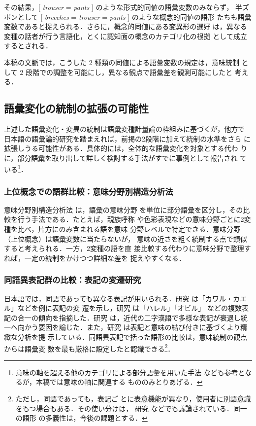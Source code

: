 \documentclass[submit]{ipsj}
\begin{document}
その結果，[ \emph{trouser} = \emph{pants} ] のような形式的同値の語彙変数のみならず，
半ズボンとして [ \emph{breeches} = \emph{trouser} = \emph{pants} ] のような概念的同値の語形
たちも語彙変数であると捉えられる．さらに，概念的同値にある変異形の選好
は，異なる変種の話者が行う言語化，とくに認知面の概念のカテゴリ化の根拠
として成立するとされる\cite{DePascale2019Tokenbased}．

本稿の文脈では，こうした 2 種類の同値による語彙変数の規定は，意味統制
として 2 段階での調整を可能にし，異なる観点で語彙差を観測可能にしたと
考える．
\subsection{語彙変化の統制の拡張の可能性\label{org5d51506}}
\label{sec:org1c43f4d}
上述した語彙変化・変異の統制は語彙変種計量論の枠組みに基づくが，他方で
日本語の語彙論的研究を踏まえれば，前掲の2段階に加えて統制の水準をさら
に拡張しうる可能性がある．具体的には，全体的な語彙変化を対象とする代わ
りに，部分語彙を取り出して詳しく検討する手法がすでに事例として報告され
ている\footnote{意味の軸を超える他のカテゴリによる部分語彙を用いた手法
\cite{ito2008Goi} なども参考となるが，本稿では意味の軸に関連する
もののみとりあげる．}．
\subsubsection{上位概念での語群比較：意味分野別構造分析法}
\label{sec:orgc68dd7f}
意味分野別構造分析法 \cite{tajima2000Goikenkyu} は，語彙の意味分野
を単位に部分語彙を区分し，その比較を行う手法である．たとえば，親族呼称
や色彩表現などの意味分野ごとに2変種を比べ，片方にのみ含まれる語を意味
分野レベルで特定できる．意味分野（上位概念）は語彙変数に当たらないが，
意味の近さを粗く統制する点で類似すると考えられる．一方，2変種の語を直
接比較する代わりに意味分野で整理すれば，一定の統制をかけつつ詳細な差を
捉えやすくなる．
\subsubsection{同語異表記群の比較：表記の変遷研究}
\label{sec:orgec0c737}
日本語では，同語であっても異なる表記が用いられる．研究
\cite{takahashi2019Kindai} は「カワル・カエル」などを例に表記の変
遷を示し，研究 \cite{takahashi2016Kindai} は「ハレル」「オビル」
などの複数表記の合一の傾向を指摘した．研究
\cite{mabuchi2016Kindai} は，近代の二字漢語で多様な表記が衰退し統
一へ向かう要因を論じた．また，研究 \cite{takahashi2016Kindai,takahashi2019Kindai} は表記と意味の結び付きに基づくより精緻な分析を提
示している．同語異表記で括った語形の比較は，意味統制の観点からは語彙変
数を最も厳格に設定したと認識できる\footnote{ただし，同語であっても，表記ご
とに表意機能が異なり，使用者に別語意識をもつ場合もある．その使い分けは，
研究 \cite{takahashi2025Tango} などでも議論されている．同一の語形
の多義性は，今後の課題とする．}．
\end{document}
